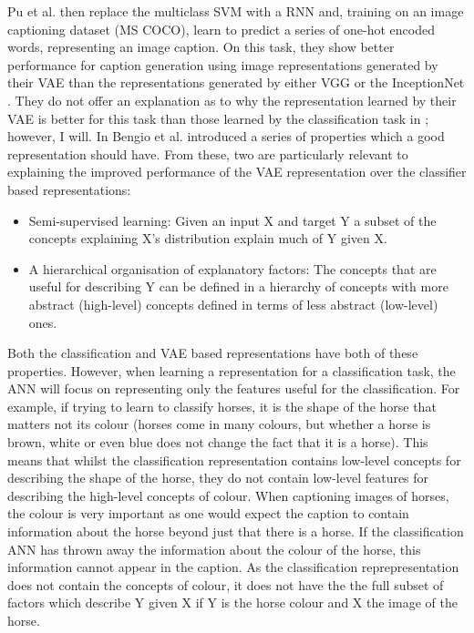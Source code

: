 Pu et al. then replace the multiclass \ac{SVM} with a \ac{RNN} and, training on an image captioning dataset (MS COCO\cite{lin2014microsoft}), learn to predict a series of one-hot encoded words, representing an image caption. On this task, they show better performance for caption generation using image representations generated by their \ac{VAE} than the representations generated by either VGG \cite{simonyan2014very} or the InceptionNet \cite{szegedy2015going}. They do not offer an explanation as to why the representation learned by their \ac{VAE} is better for this task than those learned by the classification task in \cite{simonyan2014very, szegedy2015going}; however, I will.
In \cite{repRev} Bengio et al. introduced a series of properties which a good representation should have. From these, two are particularly relevant to explaining the improved performance of the \ac{VAE} representation over the classifier based representations:
\\
\begin{itemize}
	\item Semi-supervised learning: Given an input X and target Y a subset of the concepts explaining X's distribution explain much of Y given X.
	\item A hierarchical organisation of explanatory factors: The concepts that are useful for describing Y can be defined in a hierarchy of concepts with more abstract (high-level) concepts defined in terms of less abstract (low-level) ones.
	\vspace{1em}
\end{itemize}


Both the classification and \ac{VAE} based representations have both of these properties. However, when learning a representation for a classification task, the \ac{ANN} will focus on representing only the features useful for the classification. For example, if trying to learn to classify horses, it is the shape of the horse that matters not its colour (horses come in many colours, but whether a horse is brown, white or even blue does not change the fact that it is a horse). This means that whilst the classification representation contains low-level concepts for describing the shape of the horse, they do not contain low-level features for describing the high-level concepts of colour.
When captioning images of horses, the colour is very important as one would expect the caption to contain information about the horse beyond just that there is a horse. If the classification \ac{ANN} has thrown away the information about the colour of the horse, this information cannot appear in the caption. As the classification reprepresentation does not contain the concepts of colour, it does not have the the full subset of factors which describe Y given X if Y is the horse colour and X the image of the horse.

